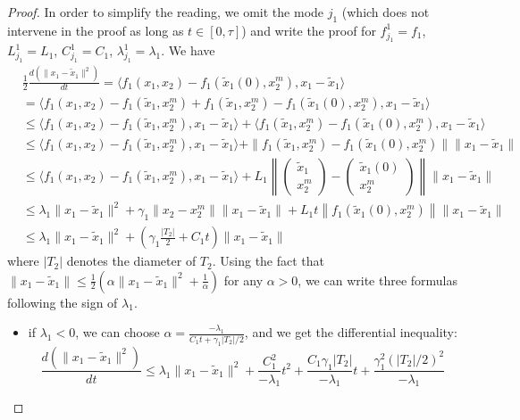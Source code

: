 \begin{proof}

In order to simplify the reading, we omit the mode $j_1$ (which does not
intervene in the proof as long as $t \in [0,\tau]$) and write the proof
for $f_{j_1}^1 = f_1$, $L_{j_1}^1 = L_1$, $C_{j_1}^1 = C_1$,
$\lambda^1_{j_1} = \lambda_1$.  We have
\begin{align*}
  &\frac{1}{2} \frac{d (\| x_1 - \tilde x_1 \|^2)}{dt}
   = \langle
  f_1(x_1,x_2) - f_1(\tilde x_1(0),x_2^m),x_1 - \tilde x_1 \rangle
\\
  & = \langle f_1(x_1,x_2) - f_1(\tilde x_1,x_2^m) + f_1(\tilde
  x_1,x_2^m) - f_1(\tilde x_1(0),x_2^m),x_1 - \tilde x_1 \rangle
\\
& \leq \langle f_1(x_1,x_2) - f_1(\tilde x_1,x_2^m), x_1 - \tilde
  x_1 \rangle + \langle f_1(\tilde x_1,x_2^m) - f_1(\tilde
  x_1(0),x_2^m),x_1 - \tilde x_1 \rangle
  \\
& \leq \langle f_1(x_1,x_2) - f_1(\tilde x_1,x_2^m), x_1 - \tilde
  x_1 \rangle + \| f_1(\tilde x_1,x_2^m) - f_1(\tilde x_1(0),x_2^m) \|
  \|x_1 - \tilde x_1 \|
  \\
  & \leq \langle f_1(x_1,x_2) - f_1(\tilde x_1,x_2^m), x_1 - \tilde x_1 \rangle + L_1 \left\| \begin{pmatrix}
      \tilde x_1 \\ x_2^m \end{pmatrix} - \begin{pmatrix} \tilde x_1(0)
      \\ x_2^m \end{pmatrix} \right\| \|x_1 - \tilde x_1 \|
  \\
  & \leq \lambda_1  \| x_1 - \tilde x_1 \|^2 + \gamma_1  \| x_2 - x_2^m \| \| x_1 - \tilde x_1 \| + L_1 t \left\| f_1(\tilde x_1(0),x_2^m)
\right\| \|x_1 - \tilde x_1 \|
\\
& \leq \lambda_1 \| x_1 - \tilde x_1 \|^2 + \left( \gamma_1
  \frac{|T_2|}{2} + C_1 t \right) \|x_1 - \tilde x_1 \|
\end{align*}
where $|T_2|$ denotes the diameter of $T_2$.  Using the fact that
$\|x_1 - \tilde x_1 \| \leq \frac{1}{2} (\alpha \|x_1 - \tilde x_1
\|^2 + \frac{1}{\alpha}) $ for any $\alpha >0$, we can write three
formulas following the sign of $\lambda_1$.
\begin{itemize}
\item if $\lambda_1 <0$, we can choose $\alpha = \frac{-
    \lambda_1}{C_1 t + \gamma_1 |T_2|/2}$, and we get the differential
  inequality:
$$\frac{d (\| x_1 - \tilde x_1 \|^2)}{dt}  \leq \lambda_1 \|x_1 - \tilde x_1 \|^2  + \frac{C_1^2}{-\lambda_1} t^2 + \frac{C_1 \gamma_1 |T_2|}{-\lambda_1}t  + \frac{\gamma_1 ^2 (|T_2|/2)^2}{-\lambda_1}$$

\end{itemize}
\end{proof}
